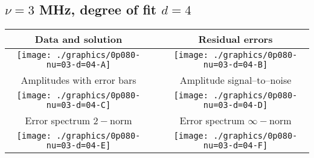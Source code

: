 

% 

\clearpage{}
\break{}

\subsection{$\nu = 3$ MHz, degree of fit $d = 4$}

\begin{table}[h]
    \begin{center}
        \begin{tabular}{ccc}
            Data and solution & \quad & Residual errors \\\hline
            \texttt{[image: ./graphics/0p080-nu=03-d=04-A]} &&
            \texttt{[image: ./graphics/0p080-nu=03-d=04-B]} \\[15pt]
            Amplitudes with error bars && Amplitude signal--to--noise \\\hline
            \texttt{[image: ./graphics/0p080-nu=03-d=04-C]} &&
            \texttt{[image: ./graphics/0p080-nu=03-d=04-D]} \\[15pt]
            Error spectrum $2-$norm && Error spectrum $\infty-$norm \\\hline
            \texttt{[image: ./graphics/0p080-nu=03-d=04-E]} &&
            \texttt{[image: ./graphics/0p080-nu=03-d=04-F]} \\[15pt]
        \end{tabular}
    \end{center}
\label{fig:elev=80, nu=3}
\end{table}



\endinput
